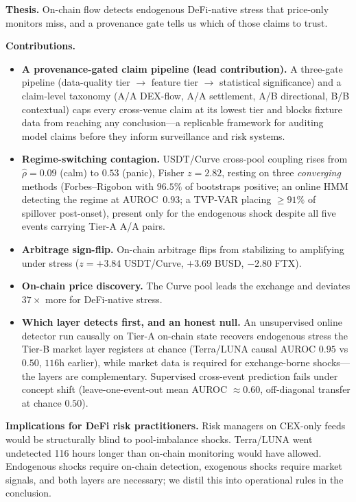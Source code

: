 \documentclass[sigconf,anonymous]{acmart}
\begin{document}
\textbf{Thesis.} On-chain flow detects endogenous DeFi-native stress that
price-only monitors miss, and a provenance gate tells us which of those claims to trust.

\textbf{Contributions.}
\begin{itemize}
\item \textbf{A provenance-gated claim pipeline (lead contribution).} A three-gate
pipeline (data-quality tier $\to$ feature tier $\to$ statistical significance) and a
claim-level taxonomy (A/A DEX-flow, A/A settlement, A/B directional, B/B contextual)
caps every cross-venue claim at its lowest tier and blocks fixture data from reaching
any conclusion---a replicable framework for auditing model claims before they inform
surveillance and risk systems.
\item \textbf{Regime-switching contagion.} USDT/Curve cross-pool coupling rises from
$\hat{\rho}=0.09$ (calm) to $0.53$ (panic), Fisher $z=2.82$, resting on three
\emph{converging} methods (Forbes--Rigobon with $96.5\%$ of bootstraps positive; an
online HMM detecting the regime at AUROC~$0.93$; a TVP-VAR placing $\ge91\%$ of spillover
post-onset), present only for the endogenous shock despite all five events carrying
Tier-A A/A pairs.
\item \textbf{Arbitrage sign-flip.} On-chain arbitrage flips from stabilizing to
amplifying under stress ($z=+3.84$ USDT/Curve, $+3.69$ BUSD, $-2.80$ FTX).
\item \textbf{On-chain price discovery.} The Curve pool leads the exchange and deviates
$37\times$ more for DeFi-native stress.
\item \textbf{Which layer detects first, and an honest null.} An unsupervised online
detector run causally on Tier-A on-chain state recovers endogenous stress the Tier-B
market layer registers at chance (Terra/LUNA causal AUROC $0.95$ vs $0.50$, $116$h
earlier), while market data is required for exchange-borne shocks---the layers are
complementary. Supervised cross-event prediction fails under concept shift
(leave-one-event-out mean AUROC ${\approx}0.60$, off-diagonal transfer at chance $0.50$).
\end{itemize}

\textbf{Implications for DeFi risk practitioners.}  Risk managers on CEX-only feeds
would be structurally blind to pool-imbalance shocks. Terra/LUNA went undetected
116 hours longer than on-chain monitoring would have allowed.  Endogenous shocks require
on-chain detection, exogenous shocks require market signals, and both layers are
necessary; we distil this into operational rules in the conclusion.
\end{document}
